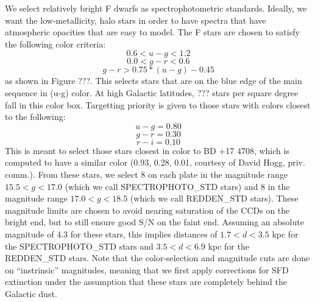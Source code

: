 \documentclass[12pt,preprint]{aastex}
\begin{document}
We select relatively bright F dwarfs as spectrophotometric 
standards.  Ideally, we want the low-metallicity, halo stars in order 
to have spectra that have atmospheric opacities that are easy to model.
The F stars are chosen to satisfy the following color criteria:
$$ 0.6 < u-g < 1.2 $$
$$ 0.0 < g-r < 0.6 $$
$$ g-r > 0.75 * (u-g) - 0.45 $$
as shown in Figure ???.
This selects stars that are on the blue edge of the main
sequence in (u-g) color.  At high Galactic latitudes,
??? stars per square degree fall in this color box.
Targetting priority is given to
those stars with colors closest to the following:
$$ u-g = 0.80 $$
$$ g-r = 0.30 $$
$$ r-i = 0.10 $$
This is meant to select those stars closest in color to BD +17 4708,
which is computed to have a similar color (0.93, 0.28, 0.01, courtesy
of David Hogg, priv. comm.).
From these stars, we select 8 on each plate in the magnitude
range $15.5 < g < 17.0$ (which we call SPECTROPHOTO\_STD stars)
and 8 in the magnitude range $17.0 < g < 18.5$ (which we call
REDDEN\_STD stars).
These magnitude limits are chosen to avoid nearing saturation
of the CCDs on the bright end, but to still ensure good S/N
on the faint end.
Assuming an absolute magnitude of 4.3 for these stars, this
implies distances of $1.7 < d < 3.5$ kpc for the SPECTROPHOTO\_STD
stars and $3.5 < d < 6.9$ kpc for the REDDEN\_STD stars.
Note that the color-selection and magnitude cuts are done on
``instrinsic'' magnitudes, meaning that we first apply corrections
for SFD extinction under the assumption that these stars are
completely behind the Galactic dust.
\end{document}
